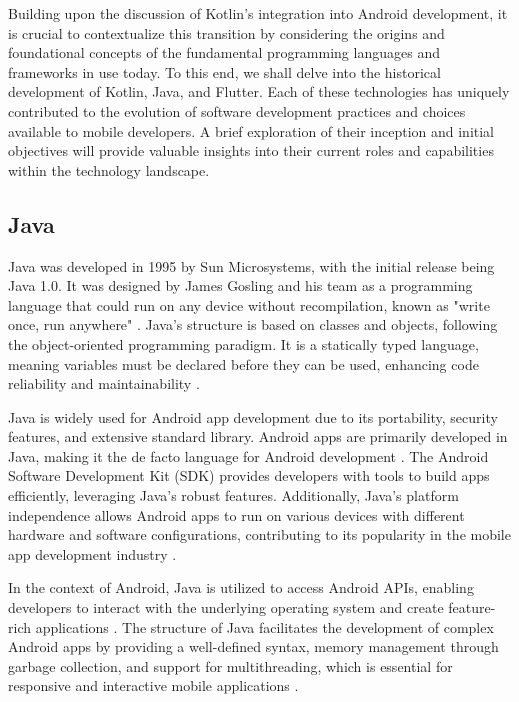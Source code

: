 Building upon the discussion of Kotlin's integration into Android development, it is crucial to contextualize this transition by considering the origins and foundational concepts of the fundamental programming languages and frameworks in use today. To this end, we shall delve into the historical development of Kotlin, Java, and Flutter. Each of these technologies has uniquely contributed to the evolution of software development practices and choices available to mobile developers. A brief exploration of their inception and initial objectives will provide valuable insights into their current roles and capabilities within the technology landscape.
\subsection{Java}
Java was developed in 1995 by Sun Microsystems, with the initial release being Java 1.0. It was designed by James Gosling and his team as a programming language that could run on any device without recompilation, known as "write once, run anywhere" \cite{raffles1817history}. Java's structure is based on classes and objects, following the object-oriented programming paradigm. It is a statically typed language, meaning variables must be declared before they can be used, enhancing code reliability and maintainability \cite{pinto2015large}. 
\par
Java is widely used for Android app development due to its portability, security features, and extensive standard library. Android apps are primarily developed in Java, making it the de facto language for Android development \cite{li2016accessing}. The Android Software Development Kit (SDK) provides developers with tools to build apps efficiently, leveraging Java's robust features. Additionally, Java's platform independence allows Android apps to run on various devices with different hardware and software configurations, contributing to its popularity in the mobile app development industry \cite{li2016accessing}.
\par
In the context of Android, Java is utilized to access Android APIs, enabling developers to interact with the underlying operating system and create feature-rich applications \cite{li2016accessing}. The structure of Java facilitates the development of complex Android apps by providing a well-defined syntax, memory management through garbage collection, and support for multithreading, which is essential for responsive and interactive mobile applications \cite{pinto2015large}.
